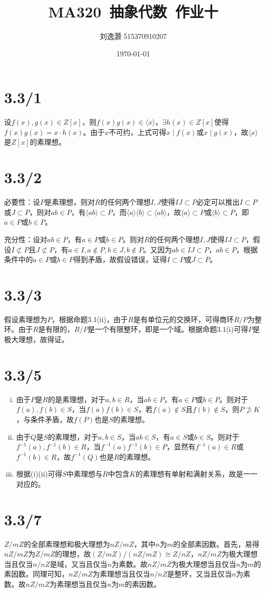 \documentclass{article}
\title{MA320\ 抽象代数\ 作业十}
\author{刘逸灏 515370910207}
\date{\today}
\begin{document}
\maketitle

\section{3.3/1}
设$f(x),g(x)\in Z[x]$，则$f(x)g(x)\in\langle x\rangle$，$\exists h(x)\in Z[x]$使得$f(x)g(x)=x\cdot h(x)$。由于$x$不可约，上式可得$x\mid f(x)$或$x\mid g(x)$，故$\langle x\rangle$是$Z[x]$的素理想。

\section{3.3/2}
必要性：设$P$是素理想，则对$R$的任何两个理想$I,J$使得$IJ\subset P$必定可以推出$I\subset P$或$J\subset P$，则对$ab\in P$，有$\langle ab\rangle\subset P$，而$\langle a\rangle\langle b\rangle\subset\langle ab\rangle$，故$\langle a\rangle\subset P$或$\langle b\rangle\subset P$，即$a\in P$或$b\in P$。

充分性：设对$ab\in P$，有$a\in P$或$b\in P$。则对$R$的任何两个理想$I,J$使得$IJ\subset P$，假设$I\not\subset P$且$J\not\subset P$，有$a\in I,a\not\in P,b\in J,b\not\in P$。又因为$ab\in IJ\subset P$，$ab\in P$，根据条件中的$a\in P$或$b\in P$得到矛盾，故假设错误，证得$I\subset P$或$J\subset P$。

\section{3.3/3}
假设素理想为$P$，根据命题3.1(ii)，由于$R$是有单位元的交换环，可得商环$R/P$为整环。由于$R$是有限的，$R/P$是一个有限整环，即是一个域。根据命题3.1(i)可得$P$是极大理想，故得证。

\section{3.3/5}
\begin{enumerate}[(i)]
\item
由于$P$是$R$的是素理想，对于$a,b\in R$，当$ab\in P$，有$a\in P$或$b\in P$。则对于$f(a),f(b)\in S$，当$f(a)f(b)\in S$，若$f(a)\not\in S$且$f(b)\not\in S$，则$P\not\supset K$，与条件矛盾，故$f(P)$也是$S$的素理想。
\item
由于$Q$是$S$的素理想，对于$a,b\in S$，当$ab\in S$，有$a\in S$或$b\in S$。则对于$f^{-1}(a),f^{-1}(b)\in R$，当$f^{-1}(a)f^{-1}(b)\in P$，显然有$f^{-1}(a)\in R$或$f^{-1}(b)\in R$，故$f^{-1}(Q)$也是$R$的素理想。
\item
根据(i)(ii)可得$S$中素理想与$R$中包含$K$的素理想有单射和满射关系，故是一一对应的。
\end{enumerate}

\section{3.3/7}
$Z/mZ$的全部素理想和极大理想为$nZ/mZ$，其中$n$为$m$的全部素因数。首先，易得$nZ/mZ$为$Z/mZ$的理想，故$(Z/mZ)/(nZ/mZ)\cong Z/nZ$，$nZ/mZ$为极大理想当且仅当$n/nZ$是域，又当且仅当$n$为素数。故$nZ/mZ$为极大理想当且仅当$n$为$m$的素因数。同理可知，$nZ/mZ$为素理想当且仅当$n/nZ$是整环，又当且仅当$n$为素数。故$nZ/mZ$为素理想当且仅当$n$为$m$的素因数。
\end{document}
